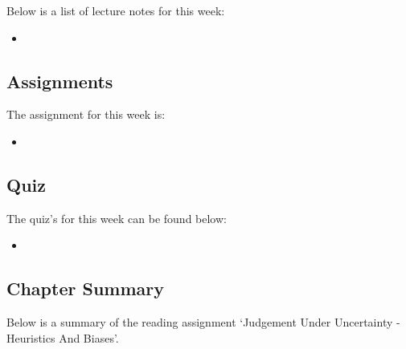 \noindent Below is a list of lecture notes for this week:

\begin{itemize}
    \item {}
\end{itemize}

\subsection{Assignments}

The assignment for this week is:

\begin{itemize}
    \item {}
\end{itemize}

\subsection{Quiz}

The quiz's for this week can be found below:

\begin{itemize}
    \item {}
\end{itemize}

\subsection{Chapter Summary}

Below is a summary of the reading assignment `Judgement Under Uncertainty - Heuristics And Biases'.

